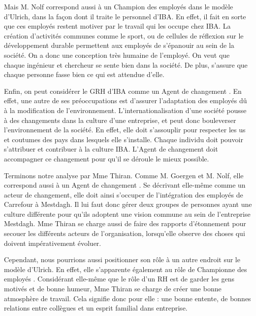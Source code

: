 Mais M. Nolf correspond aussi à un \og Champion des employés \fg{} dans le modèle d'Ulrich, dans la façon dont il traite le personnel d'IBA. En effet, il fait en sorte que ces employés restent motiver par le travail qui les occupe chez IBA. La création d'activités communes comme le sport, ou de cellules de réflexion sur le développement durable permettent aux employés de s'épanouir au sein de la société. On a donc une conception très humaine de l'employé. On veut que chaque ingénieur et chercheur se sente bien dans la société. De plus, s'assure que chaque personne fasse bien ce qui est attendue d'elle. \newline

Enfin, on peut considérer le GRH d'IBA comme un \og{} Agent de changement \fg{}. En effet, une autre de ses préoccupations est d'assurer l'adaptation des employés dû à la modification de l'environnement. L'internationalisation d'une société pousse à des changements dans la culture d'une entreprise, et peut donc bouleverser l'environnement de la société. En effet, elle doit s'assouplir pour respecter les us et coutumes des pays dans lesquels elle s'installe. Chaque individu doit pouvoir s'attribuer et contribuer à la culture IBA. L'\og Agent de changement \fg{} doit accompagner ce changement pour qu'il se déroule le mieux possible. \newline

Terminons notre analyse par Mme Thiran. Comme M. Goergen et M. Nolf, elle correspond aussi à un \og Agent de changement \fg{} . Se décrivant elle-même comme un acteur de changement, elle doit ainsi s'occuper de l'intégration des employés de Carrefour à Mestdagh. Il lui faut donc gérer deux groupes de personnes ayant une culture différente pour qu'ils adoptent une vision commune au sein de l'entreprise Mestdagh. Mme Thiran se charge aussi de faire des rapports d'étonnement pour \og secouer \fg{} les différents acteurs de l'organisation, lorsqu'elle observe des choses qui doivent impérativement évoluer.\newline

Cependant, nous pourrions aussi positionner son rôle à un autre endroit sur le modèle d'Ulrich. En effet, elle s'apparente également au rôle de \og Championne des employés \fg{}. Considérant elle-même que le rôle d'un RH est de garder les gens motivés et de bonne humeur, Mme Thiran se charge de créer une bonne atmosphère de travail. Cela signifie donc pour elle : une bonne entente, de bonnes relations entre collègues et un esprit familial dans entreprise. 

